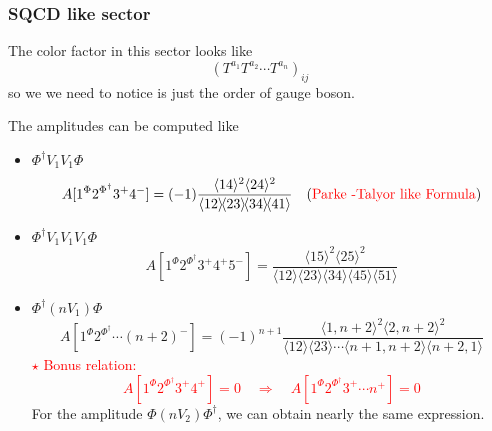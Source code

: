\documentclass{beamer}
\newcommand{\avg}[1]{\langle #1 \rangle}
\newcommand{\mdavg}[2]{\langle #1 \rangle\!\langle #2 \rangle}
\begin{document}
\begin{frame}
    \frametitle{SQCD like sector}
    The color factor in this sector looks like
    \begin{equation*}
        (T^{a_1}T^{a_2}\cdots T^{a_n})_{ij}
    \end{equation*}
    so we we need to notice is just the order of gauge boson.

    The amplitudes can be computed like 
    \begin{itemize}
        \item $\Phi^\dagger V_1V_1\Phi$
        \begin{align*}
            A[1^\Phi2^{\Phi^\dagger}3^+4^-]=(-1)\frac{\avg{14}^2\avg{24}^2}{\mdavg{12}{23}\!\mdavg{34}{41}}\quad (\textcolor{red}{\text{Parke -Talyor like Formula}})
        \end{align*}
        \item $\Phi^\dagger V_1V_1V_1\Phi$
            \begin{equation*}
                A[1^\Phi2^{\Phi^\dagger}3^+4^+5^-]=\frac{\avg{15}^2\!\avg{25}^2}{\mdavg{12}{23}\!\mdavg{34}{45}\!\avg{51}}
            \end{equation*}
    \end{itemize}
\end{frame}

\begin{frame}
    \begin{itemize}
        \item $\Phi^\dagger (nV_1)\Phi$
            \begin{equation*}
                A[1^\Phi2^{\Phi^\dagger}\cdots(n+2)^-]=(-1)^{n+1}\frac{\avg{1,n+2}^2\avg{2,n+2}^2}{\mdavg{12}{23}\cdots\mdavg{n+1,n+2}{n+2,1}}
            \end{equation*}
            \textcolor{red}{$\star$ Bonus relation: \begin{equation*}
                A[1^\Phi2^{\Phi^\dagger}3^+4^+]=0\quad \Rightarrow  \quad A[1^\Phi2^{\Phi^\dagger}3^+\cdots n^+]=0 \end{equation*}}
        For the amplitude $\Phi (nV_2)\Phi^\dagger$, we can obtain nearly the same expression.
    \end{itemize}
\end{frame}
\end{document}
